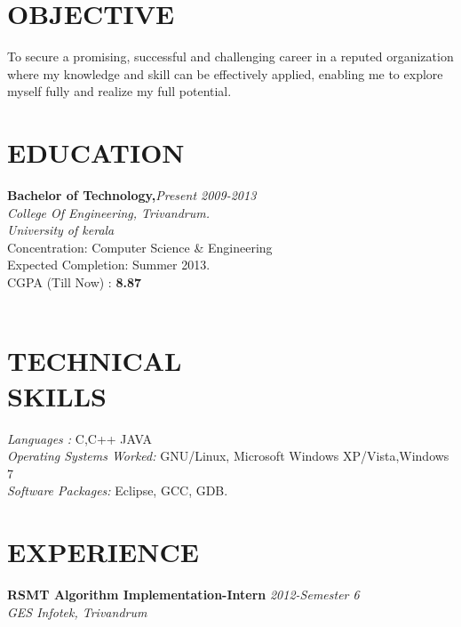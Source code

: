\documentclass[line,margin]{res}
\begin{document}
\address{\large abilngeorge@gmail.com}
\address{\large (+91)9497359361}



\begin{resume}
  
  \section{OBJECTIVE}       
To secure a promising, successful and challenging career in a reputed organization where my knowledge and skill can be effectively applied, enabling me to explore myself fully and realize my full potential.\\

  \section{EDUCATION} 
          {\bf Bachelor of Technology,}\hfill {\it Present 2009-2013}\\
          {\it College Of Engineering, Trivandrum.} \\
          {\it University of kerala}\\ 
          Concentration: Computer Science \& Engineering \\
          Expected Completion: Summer 2013.\\ 
          CGPA (Till Now) : {\bf 8.87} \\\\
          
  \section{TECHNICAL \\ SKILLS} 
	  {\it Languages :} C,C++ JAVA \\
          {\it Operating Systems Worked:} GNU/Linux, Microsoft Windows XP/Vista,Windows 7\\
	  {\it Software Packages:} Eclipse, GCC, GDB.
	  
   \section{EXPERIENCE}
           
	   {\bf RSMT Algorithm Implementation-Intern }\hfill {\it 2012-Semester 6 } \\
	   {\it GES Infotek, Trivandrum } \\


\end{resume}
\end{document}
